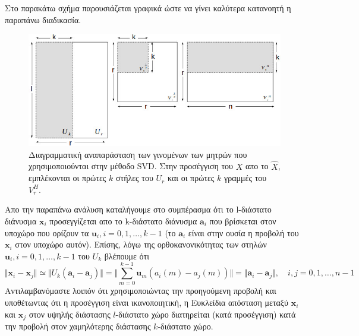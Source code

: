 \par
Στο παρακάτω σχήμα παρουσιάζεται γραφικά ώστε να γίνει καλύτερα κατανοητή η παραπάνω διαδικασία. \\
\begin{figure}[h]
\centering
\includegraphics[scale=0.7]{figs/1.jpg}
\newline
\caption{Διαγραμματική αναπαράσταση των γινομένων των μητρών που χρησιμοποιούνται στην μέθοδο \textlatin{SVD}. Στην προσέγγιση του $X$ απο το $\hat{X}$, εμπλέκονται οι πρώτες $k$ στήλες του $U_{r}$ και οι πρώτες $k$ γραμμές του $V_{r}^{H}.$} 
\end{figure}
\par
Απο την παραπάνω ανάλυση καταλήγουμε στο συμπέρασμα ότι το \textlatin{l}-διάστατο διάνυσμα $ \mathbf{x}_{i} $ προσεγγίζεται απο το \textlatin{k}-διάστατο διάνυσμα $ \mathbf{a}_{i} $ που βρίσκεται στον υποχώρο που ορίζουν τα $ \mathbf{u}_{i},i=0,1,\ldots,k-1$ (το $ \mathbf{a}_{i}$ είναι στην ουσία η προβολή του $ \mathbf{x}_{i} $ στον υποχώρο αυτόν). Επίσης, λόγω της ορθοκανονικότητας των στηλών $ \mathbf{u}_{i},i=0,1,\ldots,k-1 $ του $ U_{k} $ βλέπουμε ότι
\newline\hspace*{\fill}
\begin{equation}
	\Vert \mathbf{x}_{i}-\mathbf{x}_{j} \Vert \simeq \Vert U_{k}(\mathbf{a}_{i}-\mathbf{a}_{j}) \Vert = \Vert \sum_{m=0}^{k-1} \mathbf{u}_{m} (a_{i}(m)-a_{j}(m)) \Vert = \Vert \mathbf{a}_{i}-\mathbf{a}_{j}\Vert, \quad i,j=0,1,\ldots,n-1
\end{equation}
\hspace*{\fill}\newline
Αντιλαμβανόμαστε λοιπόν ότι χρησιμοποιώντας την προηγούμενη προβολή και υποθέτωντας ότι η προσέγγιση είναι ικανοποιητική, η Ευκλείδια απόσταση μεταξύ $ \mathbf{x}_{i} $ και $ \mathbf{x}_{j} $ στον υψηλής διάστασης $l$-διάστατο χώρο διατηρείται (κατά προσέγγιση) κατά την προβολή στον χαμηλότερης διάστασης $k$-διάστατο χώρο.
